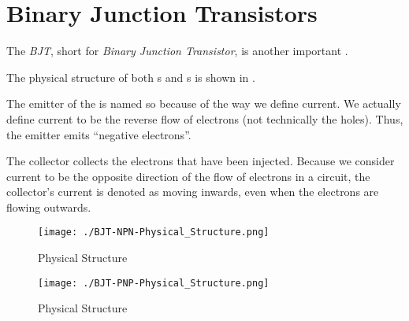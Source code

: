 \section{Binary Junction Transistors}\label{sec:BJTs}
\begin{definition}[BJT]\label{def:BJT}
  The \emph{BJT}, short for \emph{Binary Junction Transistor}, is another important .

  The physical structure of both \NPNTransistor{}s and \PNPTransistor{}s is shown in .

  \begin{remark}
    The emitter of the  is named so because of the way we define current.
    We actually define current to be the reverse flow of electrons (not technically the holes).
    Thus, the emitter emits ``negative electrons''.

    The collector collects the electrons that have been injected.
    Because we consider current to be the opposite direction of the flow of electrons in a circuit, the collector's current is denoted as moving inwards, even when the electrons are flowing outwards.
  \end{remark}
\end{definition}

\begin{figure}[h!tbp]
  \centering
  \texttt{[image: ./BJT-NPN-Physical\_Structure.png]}
  \caption{\NPNTransistor{} Physical Structure \parencite[p.~307]{sedraTextbook7}}
  \label{fig:BJT-NPN-Physical_Structure}
\end{figure}

\begin{figure}[h!tbp]
  \centering
  \texttt{[image: ./BJT-PNP-Physical\_Structure.png]}
  \caption{\PNPTransistor{} Physical Structure \parencite[p.~307]{sedraTextbook7}}
  \label{fig:BJT-PNP-Physical_Structure}
\end{figure}


